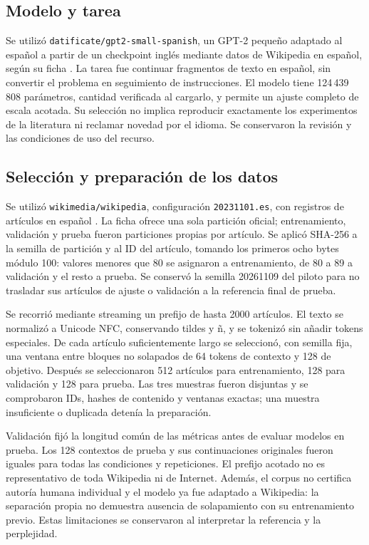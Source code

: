\documentclass[12pt,letterpaper]{article}
\begin{document}
\subsection{Modelo y tarea}

Se utilizó \texttt{datificate/gpt2-small-spanish}, un GPT-2 pequeño
adaptado al español a partir de un checkpoint inglés mediante datos de
Wikipedia en español, según su ficha \cite{spanishmodelcard}. La tarea
fue continuar fragmentos de texto en español, sin convertir el problema
en seguimiento de instrucciones. El modelo tiene 124\,439\,808 parámetros,
cantidad verificada al cargarlo, y permite un ajuste completo de escala
acotada. Su selección no implica reproducir exactamente los
experimentos de la literatura ni reclamar novedad por el idioma.
Se conservaron la revisión y las condiciones de uso del recurso.

\subsection{Selección y preparación de los datos}

Se utilizó \texttt{wikimedia/wikipedia}, configuración
\texttt{20231101.es}, con registros de artículos en español
\cite{wikipediacard}. La ficha ofrece una sola partición oficial;
entrenamiento, validación y prueba fueron particiones propias por artículo.
Se aplicó SHA-256 a la semilla de partición y al ID del artículo, tomando
los primeros ocho bytes módulo 100: valores menores que 80 se asignaron
a entrenamiento, de 80 a 89 a validación y el resto a prueba. Se conservó
la semilla 20261109 del piloto para no trasladar sus artículos de ajuste
o validación a la referencia final de prueba.

Se recorrió mediante streaming un prefijo de hasta 2000 artículos. El texto
se normalizó a Unicode NFC, conservando tildes y ñ, y se tokenizó sin
añadir tokens especiales. De cada artículo suficientemente largo se
seleccionó, con semilla fija, una ventana entre bloques no solapados de
64 tokens de contexto y 128 de objetivo. Después se seleccionaron 512
artículos para entrenamiento, 128 para validación y 128 para prueba.
Las tres muestras fueron disjuntas y se comprobaron IDs, hashes de contenido
y ventanas exactas; una muestra insuficiente o duplicada detenía la preparación.

Validación fijó la longitud común de las métricas antes de evaluar modelos
en prueba. Los 128 contextos de prueba y sus continuaciones originales fueron
iguales para todas las condiciones y repeticiones. El prefijo acotado no es
representativo de toda Wikipedia ni de Internet. Además, el corpus no
certifica autoría humana individual y el modelo ya fue adaptado a Wikipedia:
la separación propia no demuestra ausencia de solapamiento con su entrenamiento
previo. Estas limitaciones se conservaron al interpretar la referencia y la
perplejidad.
\end{document}
